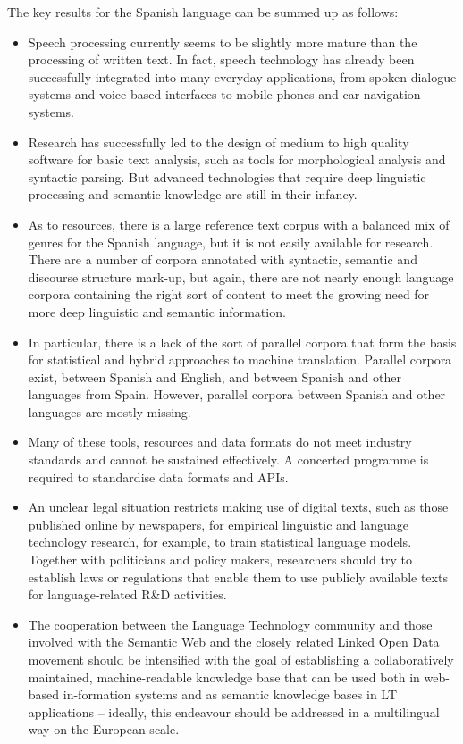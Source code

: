 \begin{multicols}{2}
The key results for the Spanish language can be summed up as follows:

\begin{itemize}
\item	Speech processing currently seems to be slightly more mature than the processing of written text. In fact, speech technology has already been successfully integrated into many everyday applications, from spoken dialogue systems and voice-based interfaces to mobile phones and car navigation systems.
\item	Research has successfully led to the design of medium to high quality software for basic text analysis, such as tools for morphological analysis and syntactic parsing. But advanced technologies that require deep linguistic processing and semantic knowledge are still in their infancy.
\item	As to resources, there is a large reference text corpus with a balanced mix of genres for the Spanish language, but it is not easily available for research. There are a number of corpora annotated with syntactic, semantic and discourse structure mark-up, but again, there are not nearly enough language corpora containing the right sort of content to meet the growing need for more deep linguistic and semantic information.
\item	In particular, there is a lack of the sort of parallel corpora that form the basis for statistical and hybrid approaches to machine translation. Parallel corpora exist, between Spanish and English, and between Spanish and other languages from Spain. However, parallel corpora between Spanish and other languages are mostly missing.
\item	Many of these tools, resources and data formats do not meet industry standards and cannot be sustained effectively. A concerted programme is required to standardise data formats and APIs.
\item	An unclear legal situation restricts making use of digital texts, such as those published online by newspapers, for empirical linguistic and language technology research, for example, to train statistical language models. Together with politicians and policy makers, researchers should try to establish laws or regulations that enable them to use publicly available texts for language-related R\&D activities.
\item	The cooperation between the Language Technology community and those involved with the Semantic Web and the closely related Linked Open Data movement should be intensified with the goal of establishing a collaboratively maintained, machine-readable knowledge base that can be used both in web-based in-formation systems and as semantic knowledge bases in LT applications – ideally, this endeavour should be addressed in a multilingual way on the European scale. 
\end{itemize}


\end{multicols}

